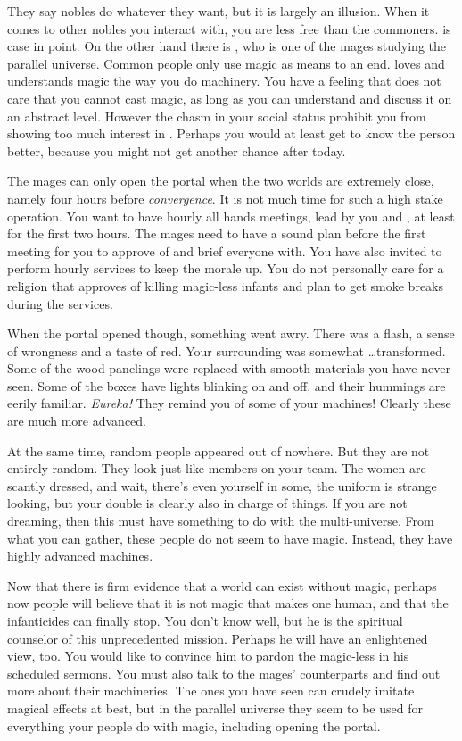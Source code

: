 \documentclass[char]{guildcamp3}
\begin{document}
They say nobles do whatever they want, but it is largely an illusion. When it comes to other nobles you interact with, you are less free than the commoners. \cNobleTwo{} is case in point. On the other hand there is \cMageOne{\intro}, who is one of the mages studying the parallel universe. Common people only use magic as means to an end. \cMageOne{} loves and understands magic the way you do machinery. You have a feeling that  does not care that you cannot cast magic, as long as you can understand and discuss it on an abstract level. However the chasm in your social status prohibit you from showing too much interest in \cMageOne{}. Perhaps you would at least get to know the person better, because you might not get another chance after today.

The mages can only open the portal when the two worlds are extremely close, namely four hours before \emph{convergence}. It is not much time for such a high stake operation. You want to have hourly all hands meetings, lead by you and \cNobleOne{}, at least for the first two hours. The mages need to have a sound plan before the first meeting for you to approve of and brief everyone with. You have also invited \cPaladin{} to perform hourly services to keep the morale up. You do not personally care for a religion that approves of killing magic-less infants and plan to get smoke breaks during the services.

When the portal opened though, something went awry. There was a flash, a sense of wrongness and a taste of red. Your surrounding was somewhat \ldots transformed. Some of the wood panelings were replaced with smooth materials you have never seen. Some of the boxes have lights blinking on and off, and their hummings are eerily familiar. \emph{Eureka!} They remind you of some of your machines! Clearly these are much more advanced. 

At the same time, random people appeared out of nowhere. But they are not entirely random. They look just like members on your team. The women are scantly dressed, and wait, there's even yourself in some, the uniform is strange looking, but your double is clearly also in charge of things. If you are not dreaming, then this must have something to do with the multi-universe. From what you can gather, these people do not seem to have magic. Instead, they have highly advanced machines.

Now that there is firm evidence that a world can exist without magic, perhaps now people will believe that it is not magic that makes one human, and that the infanticides can finally stop. You don't know \cPaladin{} well, but he is the spiritual counselor of this unprecedented mission. Perhaps he will have an enlightened view, too. You would like to convince him to pardon the magic-less in his scheduled sermons. You must also talk to the mages' counterparts and find out more about their machineries. The ones you have seen can crudely imitate magical effects at best, but in the parallel universe they seem to be used for everything your people do with magic, including opening the portal. 
\end{document}
